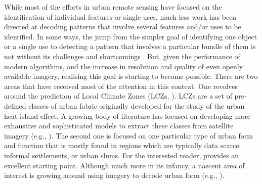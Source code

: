 While most of the efforts in urban remote sensing have focused on the identification of
individual features or single uses, much less work has been directed at decoding
patterns that involve several features and/or uses to be identified.
In some ways, the jump from the simpler goal of identifying one object or a single use
to detecting a pattern that involves a particular bundle of them is not without its
challenges and shortcomings \citep{wang2022knowledge}. But, given the performance of
modern algorithms, and the increase in resolution and quality of even openly available
imagery, realising this goal is starting to become possible.
There are two areas that have received most of the attention in this context. One
revolves around the prediction of Local Climate Zones (LCZs, \citealp{stewart2012}).
LCZs are a set of pre-defined classes of urban fabric originally developed for the study
of the urban heat island effect. A growing body of literature has focused on developing
more exhaustive and sophisticated models to extract these classes from satellite imagery
(e.g., \citealp{koc2017mapping, wang2018mapping, liu2020local, taubenbock2020,
zhou2021parcel, zhou2022deep}).
The second one is focused on one particular type of urban form and function that is
mostly found in regions which are typically data scarce: informal settlements, or urban
slums. For the interested reader, \cite{slums2016} provides an excellent starting point.
Although much more in its infancy, a nascent area of interest is growing around using
imagery to decode urban form (e.g., \citealp{04f9ab8f6c714010ac39b58230f59d85}).


